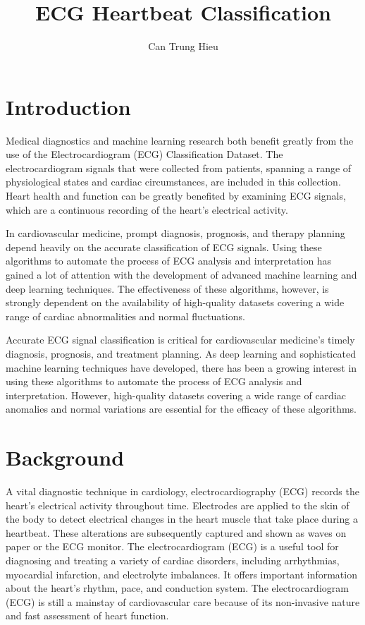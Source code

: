 \documentclass[conference]{IEEEtran}
\title{ECG Heartbeat Classification}
\author{Can Trung Hieu}
\begin{document}
\twocolumn

\maketitle

\section{Introduction}

Medical diagnostics and machine learning research both benefit greatly from the use of the Electrocardiogram (ECG) Classification Dataset. The electrocardiogram signals that were collected from patients, spanning a range of physiological states and cardiac circumstances, are included in this collection. Heart health and function can be greatly benefited by examining ECG signals, which are a continuous recording of the heart's electrical activity.

In cardiovascular medicine, prompt diagnosis, prognosis, and therapy planning depend heavily on the accurate classification of ECG signals. Using these algorithms to automate the process of ECG analysis and interpretation has gained a lot of attention with the development of advanced machine learning and deep learning techniques. The effectiveness of these algorithms, however, is strongly dependent on the availability of high-quality datasets covering a wide range of cardiac abnormalities and normal fluctuations.

Accurate ECG signal classification is critical for cardiovascular medicine's timely diagnosis, prognosis, and treatment planning. As deep learning and sophisticated machine learning techniques have developed, there has been a growing interest in using these algorithms to automate the process of ECG analysis and interpretation. However, high-quality datasets covering a wide range of cardiac anomalies and normal variations are essential for the efficacy of these algorithms.

\section{Background}

A vital diagnostic technique in cardiology, electrocardiography (ECG) records the heart's electrical activity throughout time. Electrodes are applied to the skin of the body to detect electrical changes in the heart muscle that take place during a heartbeat. These alterations are subsequently captured and shown as waves on paper or the ECG monitor. The electrocardiogram (ECG) is a useful tool for diagnosing and treating a variety of cardiac disorders, including arrhythmias, myocardial infarction, and electrolyte imbalances. It offers important information about the heart's rhythm, pace, and conduction system. The electrocardiogram (ECG) is still a mainstay of cardiovascular care because of its non-invasive nature and fast assessment of heart function.
\end{document}
